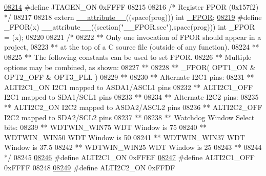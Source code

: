 \begin{DoxyCode}
\hypertarget{a00015_source_l08214}{}\hyperlink{a00015_aa569c0dc426e0de20ed4fccea7a75507}{08214} \textcolor{preprocessor}{#define JTAGEN\_ON            0xFFFF}
08215 
08216 \textcolor{comment}{/* Register FPOR (0x157f2)                               */}
08217 
08218 \textcolor{keyword}{extern} \hyperlink{a00015_a493c46f03454991ccc5aa7a6e1dfb2a7}{\_\_attribute\_\_}((space(prog))) int \hyperlink{a00015_a0d8fae652b4695a239f1ffffaff3f6b5}{\_FPOR};
\hypertarget{a00015_source_l08219}{}\hyperlink{a00015_a0d8fae652b4695a239f1ffffaff3f6b5}{08219} \textcolor{preprocessor}{#define \_FPOR(x) \_\_attribute\_\_((section("\_\_FPOR.sec"),space(prog))) int \_FPOR = (x);}
08220 
08221 \textcolor{comment}{/*}
08222 \textcolor{comment}{** Only one invocation of FPOR should appear in a project,}
08223 \textcolor{comment}{** at the top of a C source file (outside of any function).}
08224 \textcolor{comment}{**}
08225 \textcolor{comment}{** The following constants can be used to set FPOR.}
08226 \textcolor{comment}{** Multiple options may be combined, as shown:}
08227 \textcolor{comment}{**}
08228 \textcolor{comment}{** \_FPOR( OPT1\_ON & OPT2\_OFF & OPT3\_PLL )}
08229 \textcolor{comment}{**}
08230 \textcolor{comment}{**   Alternate I2C1 pins:}
08231 \textcolor{comment}{**     ALTI2C1\_ON           I2C1 mapped to ASDA1/ASCL1 pins}
08232 \textcolor{comment}{**     ALTI2C1\_OFF          I2C1 mapped to SDA1/SCL1 pins}
08233 \textcolor{comment}{**}
08234 \textcolor{comment}{**   Alternate I2C2 pins:}
08235 \textcolor{comment}{**     ALTI2C2\_ON           I2C2 mapped to ASDA2/ASCL2 pins}
08236 \textcolor{comment}{**     ALTI2C2\_OFF          I2C2 mapped to SDA2/SCL2 pins}
08237 \textcolor{comment}{**}
08238 \textcolor{comment}{**   Watchdog Window Select bits:}
08239 \textcolor{comment}{**     WDTWIN\_WIN75         WDT Window is 75%
08240 \textcolor{comment}{**     WDTWIN\_WIN50         WDT Window is 50%
08241 \textcolor{comment}{**     WDTWIN\_WIN37         WDT Window is 37.5%
08242 \textcolor{comment}{**     WDTWIN\_WIN25         WDT Window is 25%
08243 \textcolor{comment}{**}
08244 \textcolor{comment}{*/}
08245 
\hypertarget{a00015_source_l08246}{}\hyperlink{a00015_a95baf12ba194aaed055830b99394a9a7}{08246} \textcolor{preprocessor}{#define ALTI2C1\_ON           0xFFEF}
\hypertarget{a00015_source_l08247}{}\hyperlink{a00015_a4c4a083dcc5ff04c199c6bc5c7c60611}{08247} \textcolor{preprocessor}{#define ALTI2C1\_OFF          0xFFFF}
08248 
\hypertarget{a00015_source_l08249}{}\hyperlink{a00015_a2f39808381c7de9435d9a0ba15154716}{08249} \textcolor{preprocessor}{#define ALTI2C2\_ON           0xFFDF}
}}}}
\end{DoxyCode}
